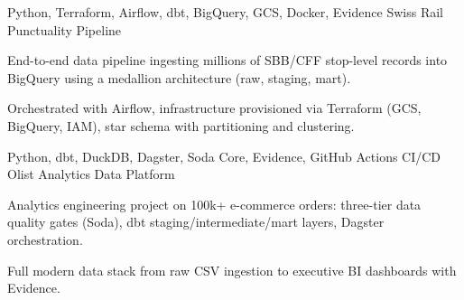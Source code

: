 \begin{cventries}
  \cventry
    {Python, Terraform, Airflow, dbt, BigQuery, GCS, Docker, Evidence}
    {Swiss Rail Punctuality Pipeline}
    {}
    {}
    {
      \begin{cvitems}
        \item {End-to-end data pipeline ingesting millions of SBB/CFF stop-level records into BigQuery using a medallion architecture (raw, staging, mart).}
        \item {Orchestrated with Airflow, infrastructure provisioned via Terraform (GCS, BigQuery, IAM), star schema with partitioning and clustering.}
      \end{cvitems}
    }

  \cventry
    {Python, dbt, DuckDB, Dagster, Soda Core, Evidence, GitHub Actions CI/CD}
    {Olist Analytics Data Platform}
    {}
    {}
    {
      \begin{cvitems}
        \item {Analytics engineering project on 100k+ e-commerce orders: three-tier data quality gates (Soda), dbt staging/intermediate/mart layers, Dagster orchestration.}
        \item {Full modern data stack from raw CSV ingestion to executive BI dashboards with Evidence.}
      \end{cvitems}
    }
\end{cventries}
